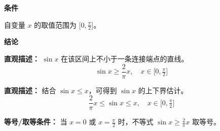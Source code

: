 \begin{statementbox}

\textbf{\textcolor{CStatement}{条件}}
\begin{description}[style=nextline, leftmargin=2.8em, labelsep=0.5em, itemsep=0.35em]
    \item[\textbf{\textcolor{CStatement}{条件 1（定义域范围）：}}] 自变量 $x$ 的取值范围为 $\big[0, \frac{\pi}{2}\big]$。
\end{description}

\textbf{\textcolor{CStatement}{结论}}
\begin{description}[style=nextline, leftmargin=2.8em, labelsep=0.5em, itemsep=0.45em]
    \item[\textbf{\textcolor{CStatement}{结论一（线性下界）：}}]
    \textbf{\textcolor{CStatement}{直观描述：}} $\sin x$ 在该区间上不小于一条连接端点的直线。
    \[
    \sin x \geq \frac{2}{\pi}x, \quad x \in \big[0,\tfrac{\pi}{2}\big]
    \]

    \item[\textbf{\textcolor{CStatement}{推广结论（上下界夹挤）：}}]
    \textbf{\textcolor{CStatement}{直观描述：}} 结合 $\sin x \leq x$，可得到 $\sin x$ 的上下界估计。
    \[
    \frac{2}{\pi}x \leq \sin x \leq x, \quad x \in \big[0,\tfrac{\pi}{2}\big]
    \]
\end{description}

\textbf{\textcolor{CStatement}{等号/取等条件：}} 当 $x=0$ 或 $x=\frac{\pi}{2}$ 时，不等式 $\sin x \geq \frac{2}{\pi}x$ 取等号。

\end{statementbox}
